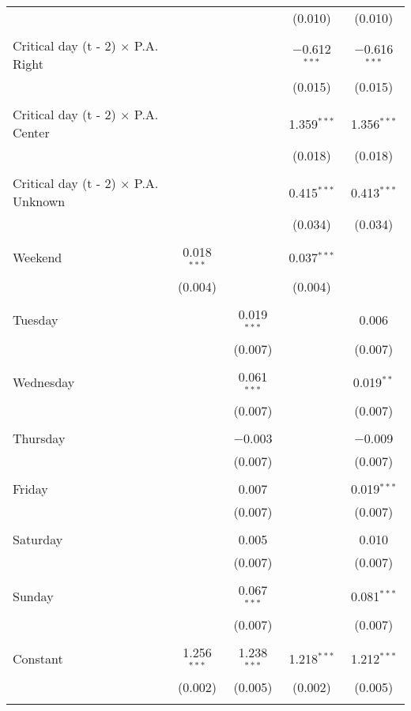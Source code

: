 \documentclass[
]{article}
\begin{document}
\begin{table}[!htbp]
{\begin{tabular}{@{\extracolsep{5pt}}lcccc}
  &  &  & (0.010) & (0.010) \\ 
  & & & & \\ 
 Critical day (t - 2) $\times$ P.A. Right &  &  & $-$0.612$^{***}$ & $-$0.616$^{***}$ \\ 
  &  &  & (0.015) & (0.015) \\ 
  & & & & \\ 
 Critical day (t - 2) $\times$ P.A. Center &  &  & 1.359$^{***}$ & 1.356$^{***}$ \\ 
  &  &  & (0.018) & (0.018) \\ 
  & & & & \\ 
 Critical day (t - 2) $\times$ P.A. Unknown &  &  & 0.415$^{***}$ & 0.413$^{***}$ \\ 
  &  &  & (0.034) & (0.034) \\ 
  & & & & \\ 
 Weekend & 0.018$^{***}$ &  & 0.037$^{***}$ &  \\ 
  & (0.004) &  & (0.004) &  \\ 
  & & & & \\ 
 Tuesday &  & 0.019$^{***}$ &  & 0.006 \\ 
  &  & (0.007) &  & (0.007) \\ 
  & & & & \\ 
 Wednesday &  & 0.061$^{***}$ &  & 0.019$^{**}$ \\ 
  &  & (0.007) &  & (0.007) \\ 
  & & & & \\ 
 Thursday &  & $-$0.003 &  & $-$0.009 \\ 
  &  & (0.007) &  & (0.007) \\ 
  & & & & \\ 
 Friday &  & 0.007 &  & 0.019$^{***}$ \\ 
  &  & (0.007) &  & (0.007) \\ 
  & & & & \\ 
 Saturday &  & 0.005 &  & 0.010 \\ 
  &  & (0.007) &  & (0.007) \\ 
  & & & & \\ 
 Sunday &  & 0.067$^{***}$ &  & 0.081$^{***}$ \\ 
  &  & (0.007) &  & (0.007) \\ 
  & & & & \\ 
 Constant & 1.256$^{***}$ & 1.238$^{***}$ & 1.218$^{***}$ & 1.212$^{***}$ \\ 
  & (0.002) & (0.005) & (0.002) & (0.005) \\ 
  & & & & \\ 

\end{tabular}}
\end{table}
\end{document}
